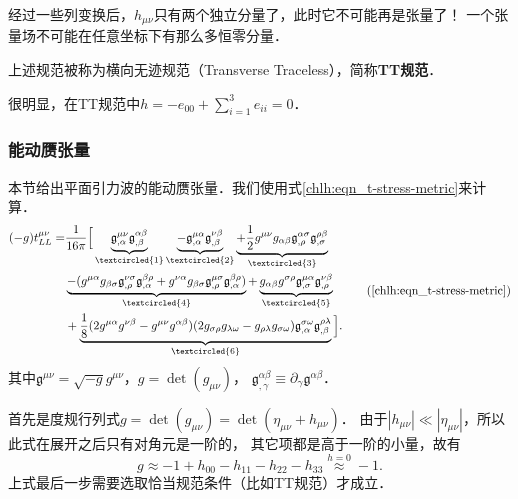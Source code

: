 经过一些列变换后，$h_{\mu\nu}$只有两个独立分量了，此时它不可能再是张量了！
一个张量场不可能在任意坐标下有那么多恒零分量．

上述规范被称为{\heiti 横向无迹规范}（Transverse Traceless），简称{\bfseries \heiti TT规范}．


很明显，在TT规范中$h=-e_{00}+\sum_{i=1}^{3}e_{ii}=0$．


\subsubsection{能动赝张量}

本节给出平面引力波的能动赝张量．我们使用式\eqref{chlh:eqn_t-stress-metric}来计算．
\begin{equation}
	\begin{aligned}
		(-g)t_{LL}^{\mu \nu} =& \frac{1}{16\pi} \Big[
		\underbrace{\mathfrak{g}^{\mu \nu}_{,\alpha}\mathfrak{g}^{\alpha \beta}_{,\beta} }_{\tiny \textcircled{1}}
		\underbrace{- \mathfrak{g}^{\mu \alpha}_{,\alpha}\mathfrak{g}^{\nu \beta}_{,\beta} }_{\tiny \textcircled{2}}
		\underbrace{+\frac{1}{2}g^{\mu \nu}g_{\alpha \beta}\mathfrak{g}^{\alpha \sigma}_{,\rho} 
			\mathfrak{g}^{\rho \beta}_{,\sigma}}_{\tiny \textcircled{3}} \\
		&\underbrace{-(g^{\mu \alpha}g_{\beta \sigma}\mathfrak{g}^{\nu \sigma}_{,\rho}
		\mathfrak{g}^{\beta \rho}_{,\alpha}+g^{\nu \alpha}g_{\beta \sigma}
		\mathfrak{g}^{\mu \sigma}_{,\rho}\mathfrak{g}^{\beta \rho}_{,\alpha})}_{\tiny \textcircled{4}} 
		+ \underbrace{g_{\alpha \beta}g^{\sigma \rho}\mathfrak{g}^{\mu \alpha}_{,\sigma}
		\mathfrak{g}^{\nu \beta}_{,\rho}}_{\tiny \textcircled{5}} \\
		&+\underbrace{\frac{1}{8}(2g^{\mu \alpha}g^{\nu \beta}-g^{\mu \nu}g^{\alpha \beta})
		(2g_{\sigma \rho}g_{\lambda \omega}-g_{\rho \lambda}g_{\sigma \omega})
		\mathfrak{g}^{\sigma \omega}_{,\alpha}\mathfrak{g}^{\rho \lambda}_{,\beta}}_{\tiny \textcircled{6}}  \Big] .
	\end{aligned} \tag{\ref{chlh:eqn_t-stress-metric}}
\end{equation}
其中$\mathfrak{g}^{\mu\nu}=\sqrt{-g}g^{\mu\nu}$，$g=\det(g_{\mu\nu})$，
$\mathfrak{g}^{\alpha \beta}_{,\gamma}\equiv \partial_\gamma \mathfrak{g}^{\alpha \beta}$．

首先是度规行列式$g=\det(g_{\mu\nu})= \det (\eta_{\mu\nu} + h_{\mu\nu})$．
由于$|h_{\mu\nu}|\ll |\eta_{\mu\nu}|$，所以此式在展开之后只有对角元是一阶的，
其它项都是高于一阶的小量，故有
\begin{equation}
	g\approx -1  + h_{00}-h_{11}-h_{22}-h_{33} \overset{h=0}{\approx} -1 .
\end{equation}
上式最后一步需要选取恰当规范条件（比如TT规范）才成立．


